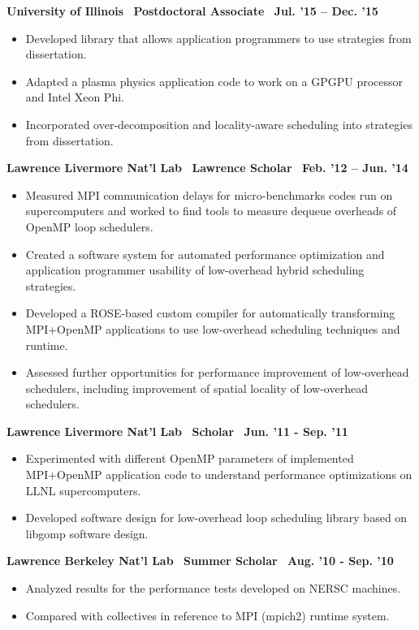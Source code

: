 \textbf{ University of Illinois$\>$$\>$$\>$$\>$Postdoctoral Associate$\>$$\>$$\>$$\>$Jul. '15 – Dec. '15}
\vspace*{-0.0in}
\begin{itemize} 
\item Developed library that allows application programmers to use strategies from dissertation.
\item Adapted a plasma physics application code to work on a
GPGPU processor and Intel Xeon Phi.
\item Incorporated over-decomposition and locality-aware scheduling into strategies from dissertation.
\end{itemize}

\textbf{Lawrence Livermore Nat’l Lab$\>$$\>$$\>$$\>$Lawrence Scholar$\>$$\>$$\>$$\>$Feb. '12 – Jun. '14}
\vspace*{-0.0in}
\begin{itemize} 
\item Measured MPI communication delays for micro-benchmarks codes run on supercomputers and worked to find tools to measure dequeue overheads of OpenMP loop schedulers.
\item Created a software system for automated performance optimization and application programmer usability of low-overhead hybrid scheduling
strategies.
\item Developed a ROSE-based custom compiler for automatically transforming MPI+OpenMP applications to use low-overhead scheduling
techniques and runtime.
\item Assessed further opportunities for performance improvement of low-overhead schedulers, including improvement of spatial locality
of low-overhead schedulers.
\end{itemize}

\textbf{Lawrence Livermore Nat’l Lab$\>$$\>$$\>$$\>$Scholar$\>$$\>$$\>$$\>$Jun. '11 - Sep. '11}
\vspace*{-0.0in}
\begin{itemize} 
\item Experimented with different OpenMP parameters of implemented MPI+OpenMP application code to understand performance optimizations on
LLNL supercomputers.
\item Developed software design for low-overhead loop scheduling library based on libgomp software design.
\end{itemize} 

\textbf{Lawrence Berkeley Nat’l Lab$\>$$\>$$\>$$\>$Summer Scholar$\>$$\>$$\>$$\>$Aug. '10 - Sep. '10}
\begin{itemize}
\item Analyzed results for the performance tests developed on NERSC machines.
\item Compared with collectives in reference to MPI (mpich2) runtime system.
\end{itemize}

